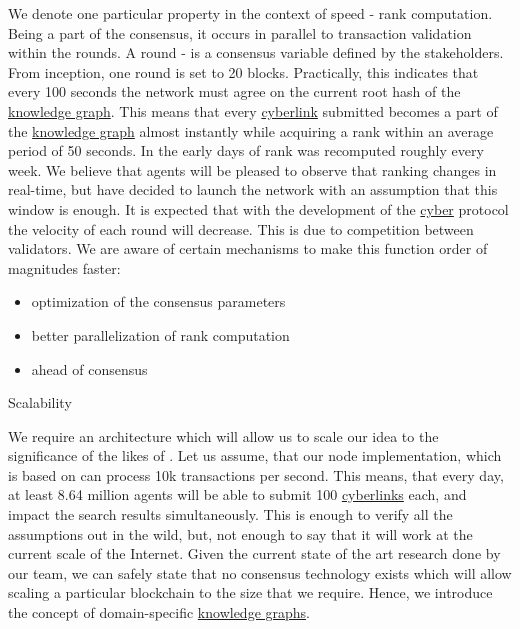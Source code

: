 \documentclass[8pt,oneside]{amsart}
\makeatletter
\newcommand{\linkred}[2]{\href{#1}{\color{red}{#2}}}
\renewcommand\subsection{\@startsection{subsection}
                                    {2}{\z@}
                                    {-3.25ex\@plus -1ex \@minus -.2ex}
                                    {0ex \@plus .2ex}
                                    {\play\Large}
                        }
\newcommand{\titleSection}[1]{\subsection{#1}}
\makeatother
\begin{document}
We denote one particular \linkred{https://github.com/cybercongress/cyberd}{cyberd} property in the context of speed - rank computation. Being a part of the consensus, it occurs in parallel to transaction validation within the rounds. A round - is a consensus variable defined by the stakeholders. From inception, one round is set to 20 blocks. Practically, this indicates that every 100 seconds the network must agree on the current root hash of the {\hyperref[knowledge-graph]{knowledge graph}}. This means that every {\hyperref[cyberlinks]{cyberlink}} submitted becomes a part of the {\hyperref[knowledge-graph]{knowledge graph}} almost instantly while acquiring a rank within an average period of 50 seconds. In the early days of \linkred{https://google.com}{Google} rank was recomputed roughly every week. We believe that agents will be pleased to observe that ranking changes in real-time, but have decided to launch the network with an assumption that this window is enough. It is expected that with the development of the {\hyperref[cyber]{cyber}} protocol the velocity of each round will decrease. This is due to competition between validators. We are aware of certain mechanisms to make this function order of magnitudes faster:

\begin{itemize}
\item optimization of the consensus parameters
\item better parallelization of rank computation
\item \linkred{https://ipfs.io/ipfs/QmZKchdeBtUeZKvsFbuWY2PHg6qn6jHjUDrg5KjHzDGWHj}{better clock} ahead of consensus
\end{itemize}

\titleSection{Scalability}\label{scalability}

We require an architecture which will allow us to scale our idea to the significance of the likes of \linkred{https://google.com}{Google}. Let us assume, that our node implementation, which is based on \linkred{https://github.com/cosmos/cosmos-sdk}{Cosmos-SDK} can process 10k transactions per second. This means, that every day, at least 8.64 million agents will be able to submit 100 {\hyperref[cyberlinks]{cyberlinks}} each, and impact the search results simultaneously. This is enough to verify all the assumptions out in the wild, but, not enough to say that it will work at the current scale of the Internet. Given the current state of the art research done by our team, we can safely state that no consensus technology exists which will allow scaling a particular blockchain to the size that we require. Hence, we introduce the concept of domain-specific {\hyperref[knowledge-graph]{knowledge graphs}}.
\end{document}

